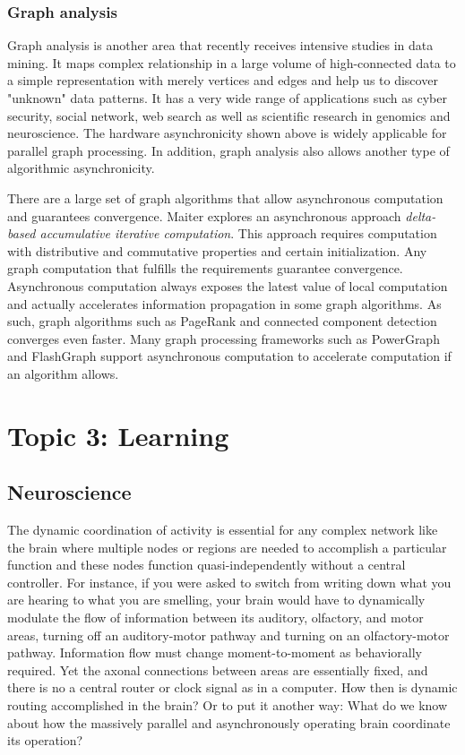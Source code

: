 \documentclass[12pt]{report}
\begin{document}
\subsubsection{Graph analysis}
Graph analysis is another area that recently receives intensive studies in
data mining. It maps complex relationship in a large volume of high-connected
data to a simple representation with merely vertices and edges and help us
to discover "unknown" data patterns. It has a very wide range of applications
such as cyber security, social network, web search as well as scientific research
in genomics and neuroscience.
The hardware asynchronicity shown above is widely applicable for parallel graph
processing. In addition, graph analysis also allows another type of algorithmic
asynchronicity.

There are a large set of graph algorithms that allow asynchronous computation
and guarantees convergence. Maiter \cite{maiter} explores an asynchronous approach
{\em delta-based accumulative iterative computation}. This approach requires
computation with distributive and commutative properties and certain initialization.
Any graph computation that fulfills the requirements guarantee convergence.
Asynchronous computation always exposes the latest value of local computation
and actually accelerates information propagation in some graph algorithms.
As such, graph algorithms such as PageRank and connected component detection
converges even faster. Many graph processing frameworks such as PowerGraph
\cite{powergraph} and FlashGraph \cite{flashgraph} support
asynchronous computation to accelerate computation if an algorithm allows.

\section*{Topic 3: Learning}

\subsection*{Neuroscience}
The dynamic coordination of activity is essential for any complex network like
the brain where multiple nodes or regions are needed to accomplish a particular
function and these nodes function quasi-independently without a central
controller. For instance, if you were asked to switch from writing down what
you are hearing to what you are smelling, your brain would have to dynamically
modulate the flow of information between its auditory, olfactory, and motor
areas, turning off an auditory-motor pathway and turning on an olfactory-motor
pathway. Information flow must change moment-to-moment as behaviorally required.
Yet the axonal connections between areas are essentially fixed, and there is no
a central router or clock signal as in a computer. How then is dynamic routing
accomplished in the brain? Or to put it another way: What do we know about how
the massively parallel and asynchronously operating brain coordinate its
operation?
\end{document}
